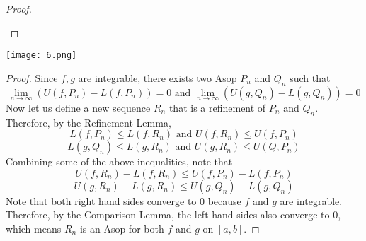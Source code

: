 \documentclass[12pt]{scrartcl}
\begin{document}
\begin{proof}
\begin{enumerate}[a.]
\end{enumerate}

\end{proof}

\newpage

\texttt{[image: 6.png]}

\begin{proof}

\hfill

Since $f, g$ are integrable, there exists two Asop $P_n$ and $Q_n$ such that 
\[\lim_{n\to\infty}(U(f, P_n) - L(f, P_n)) = 0 \text{ and } \lim_{n\to\infty}(U(g, Q_n) - L(g, Q_n)) = 0\]
Now let us define a new sequence $R_n$ that is a refinement of $P_n$ and $Q_n$. Therefore, 
by the Refinement Lemma, 
\[L(f, P_n) \leq L(f, R_n) \text{ and } U(f, R_n) \leq U(f, P_n)\]
\[L(g, Q_n) \leq L(g, R_n) \text{ and } U(g, R_n) \leq U(Q, P_n)\]
Combining some of the above inequalities, note that 
\[U(f, R_n) - L(f, R_n) \leq U(f, P_n) - L(f, P_n)\]
\[U(g, R_n) - L(g, R_n) \leq U(g, Q_n) - L(g, Q_n)\]
Note that both right hand sides converge to 0 because $f$ and $g$ are integrable. Therefore, 
by the Comparison Lemma, the left hand sides also converge to 0, which means
$R_n$ is an Asop for both $f$ and $g$ on $[a,b]$.

\end{proof}

\newpage
\end{document}
